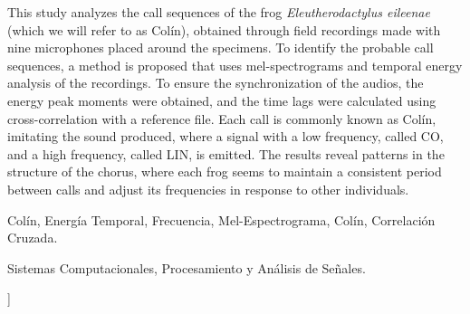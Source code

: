\documentclass[a4paper,10pt,twocolumn]{article}
\begin{document}
\begin{enabstract}

	This study analyzes the call sequences of the 
	frog \textit{Eleutherodactylus eileenae} 
	(which we will refer to as Colín), 
	obtained through field recordings made with 
	nine microphones placed around the specimens. 
	To identify the probable call sequences, 
	a method is proposed that uses mel-spectrograms 
	and temporal energy analysis of the recordings. 
	To ensure the synchronization of the audios, 
	the energy peak moments were obtained, 
	and the time lags were calculated using 
	cross-correlation with a reference file. 
	Each call is commonly known as Colín, 
	imitating the sound produced, 
	where a signal with a low frequency, called CO, 
	and a high frequency, called LIN, is emitted. 
	The results reveal patterns in the structure of 
	the chorus, where each frog seems to maintain a 
	consistent period between calls and adjust its 
	frequencies in response to other individuals.
\end{enabstract}

\begin{keywords}
	Colín,
	Energía Temporal,
	Frecuencia,
	Mel-Espectrograma,
	Colín,
	Correlación Cruzada.
\end{keywords}

\begin{topics}
	Sistemas Computacionales, Procesamiento y Análisis de Señales.
\end{topics}


\vspace{0.8cm}
]



\end{document}
